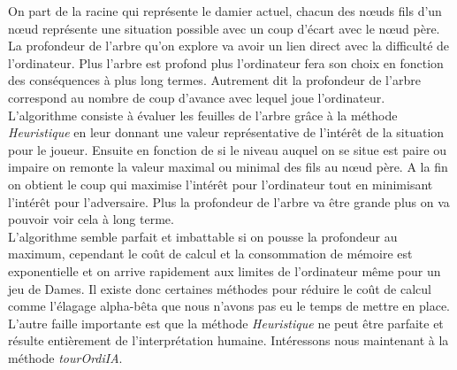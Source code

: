 \documentclass[12,french]{report}
\begin{document}
On part de la racine qui représente le damier actuel, chacun des nœuds fils d'un nœud représente une situation possible avec un coup d'écart avec le nœud père. La profondeur de l'arbre qu'on explore va avoir un lien direct avec la difficulté de l'ordinateur. Plus l'arbre est profond plus l'ordinateur fera son choix en fonction des conséquences à plus long termes. Autrement dit la profondeur de l'arbre correspond au nombre de coup d'avance avec lequel joue l'ordinateur. \\

L'algorithme consiste à évaluer les feuilles de l'arbre grâce à la méthode \textit{Heuristique} en leur donnant une valeur représentative de l'intérêt de la situation pour le joueur. Ensuite en fonction de si le niveau auquel on se situe est paire ou impaire on remonte la valeur maximal ou minimal des fils au nœud père. A la fin on obtient le coup qui maximise l'intérêt pour l'ordinateur tout en minimisant l’intérêt pour l'adversaire. Plus la profondeur de l'arbre va être grande plus on va pouvoir voir cela à long terme.\\

L’algorithme semble parfait et imbattable si on pousse la profondeur au maximum, cependant le coût de calcul et la consommation de mémoire est exponentielle et on arrive rapidement aux limites de l'ordinateur même pour un jeu de Dames. Il existe donc certaines méthodes pour réduire le coût de calcul comme l'élagage alpha-bêta que nous n'avons pas eu le temps de mettre en place.\\

L'autre faille importante est que la méthode \textit{Heuristique} ne peut être parfaite et résulte entièrement de l'interprétation humaine. Intéressons nous maintenant à la méthode \textit{tourOrdiIA}.\\
\end{document}
